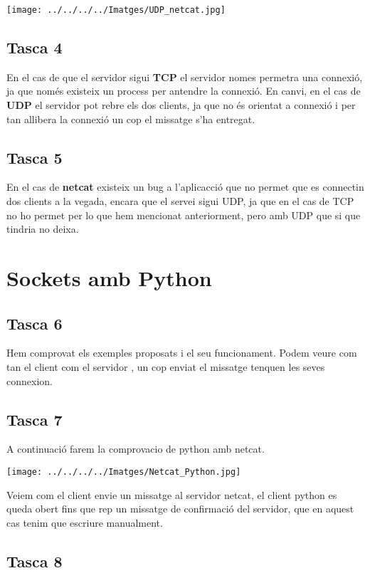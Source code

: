 \documentclass[11p]{article}
\begin{document}
\centerline{\texttt{[image: ../../../../Imatges/UDP\_netcat.jpg]} }

\subsection{Tasca 4}

En el cas de que el servidor sigui \textbf{TCP} el servidor nomes permetra una connexió, ja que només existeix un process per antendre la connexió. En canvi, en el cas de \textbf{UDP} el servidor pot rebre els dos clients, ja que no és orientat a connexió i per tan allibera la connexió un cop el missatge s'ha entregat.

\subsection{Tasca 5}

En el cas de \textbf{netcat} existeix un bug a l'aplicacció que no permet que es connectin dos clients a la vegada, encara que el servei sigui UDP, ja que en el cas de TCP no ho permet per lo que hem mencionat anteriorment, pero amb UDP que si que tindria no deixa. 


\section{Sockets amb Python}
\subsection{Tasca 6}

Hem comprovat els exemples proposats i el seu funcionament. Podem veure com tan el client com el servidor , un cop enviat el missatge tenquen les seves connexion. 
\subsection{Tasca 7}

A continuació farem la comprovacio de python amb netcat.
\newline
\centerline{\texttt{[image: ../../../../Imatges/Netcat\_Python.jpg]}}

Veiem com el client envie un missatge al servidor netcat, el client python es queda obert fins que rep un missatge de confirmació del servidor, que en aquest cas tenim que escriure manualment.

\subsection{Tasca 8}
\end{document}
